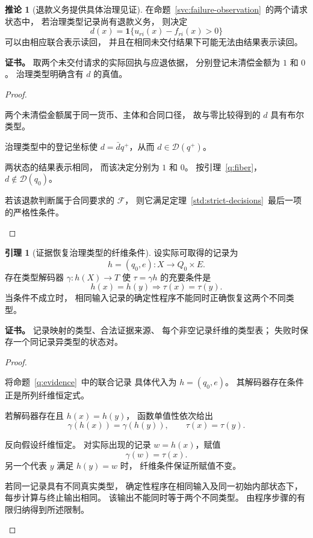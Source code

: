 \documentclass[UTF8,12pt,a4paper,openany,fontset=none,zihao=false]{ctexrep}
\theoremstyle{definition}
\newtheorem{lemma}{引理}[chapter]
\newtheorem{corollary}{推论}[chapter]
\newenvironment{certificate}{\par\noindent\textbf{证书。}\ignorespaces}{\par}
\newcommand{\1}{\mathbf 1}
\begin{document}
\begin{corollary}[退款义务提供具体治理见证]
\label{std:refund-witness}
在命题~\ref{svc:failure-observation}~的两个请求状态中，
若治理类型记录尚有退款义务，
则决定
\[
d(x)=\mathbf1\{u_{ri}(x)-f_{ri}(x)>0\}
\]
可以由相应联合表示读回，
并且在相同未交付结果下可能无法由结果表示读回。
\end{corollary}
\begin{certificate}
取两个未交付请求的实际回执与应退依据，
分别登记未清偿金额为 \(1\) 和 \(0\)。
治理类型明确含有 \(d\) 的真值。
\end{certificate}
\begin{proof}
\begin{semanticsteps}
\item 两个未清偿金额属于同一货币、主体和合同口径，
故与零比较得到的 \(d\) 具有布尔类型。
\item 治理类型中的登记坐标使
\(d=\bar d q^+\)，从而
\(d\in\mathcal D(q^+)\)。
\item 两状态的结果表示相同，
而该决定分别为 \(1\) 和 \(0\)。
按引理~\ref{q:fiber}，
\(d\notin\mathcal D(q_0)\)。
\item 若该退款判断属于合同要求的 \(\mathcal F\)，
则它满足定理~\ref{std:strict-decisions}~最后一项的严格性条件。
\end{semanticsteps}
\end{proof}

\begin{lemma}[证据恢复治理类型的纤维条件]
\label{std:evidence-recovery}
设实际可取得的记录为
\[
h=(q_0,e):X\longrightarrow Q_0\times E.
\]
存在类型解码器 \(\gamma:h(X)\to T\)
使 \(\tau=\gamma h\) 的充要条件是
\[
h(x)=h(y)\Longrightarrow\tau(x)=\tau(y).
\]
当条件不成立时，
相同输入记录的确定性程序不能同时正确恢复这两个不同类型。
\end{lemma}
\begin{certificate}
记录映射的类型、合法证据来源、
每个非空记录纤维的类型表；
失败时保存一个同记录异类型的状态对。
\end{certificate}
\begin{proof}
\begin{semanticsteps}
\item 将命题~\ref{q:evidence}~中的联合记录
具体代入为 \(h=(q_0,e)\)。
其解码器存在条件正是所列纤维恒定式。
\item 若解码器存在且 \(h(x)=h(y)\)，
函数单值性依次给出
\[
\gamma(h(x))=\gamma(h(y)),
\qquad \tau(x)=\tau(y).
\]
\item 反向假设纤维恒定。
对实际出现的记录 \(w=h(x)\)，赋值
\[
\gamma(w)=\tau(x).
\]
另一个代表 \(y\) 满足 \(h(y)=w\) 时，
纤维条件保证所赋值不变。
\item 若同一记录具有不同真实类型，
确定性程序在相同输入及同一初始内部状态下，
每步计算与终止输出相同。
该输出不能同时等于两个不同类型。
由程序步骤的有限归纳得到所述限制。
\end{semanticsteps}
\end{proof}
\end{document}
